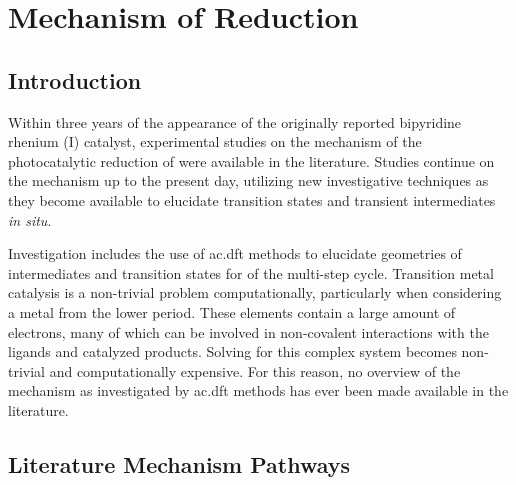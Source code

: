 \chapter{Mechanism of \texorpdfstring{}{CO2} Reduction}\label{chap.mech}

\section{Introduction}

Within three years of the appearance of the originally reported bipyridine rhenium (I) catalyst, experimental studies on the mechanism of the photocatalytic reduction of  were available in the literature\autocite{hawecker1986}. Studies continue on the mechanism up to the present day\autocite{johnson1996, koike2002, takeda2008, smieja2012, machan2014, kou2014}, utilizing new investigative techniques as they become available to elucidate transition states and transient intermediates \textit{in situ}. 

Investigation includes the use of \gls{ac.dft} methods to elucidate geometries of intermediates and transition states for of the multi-step cycle. Transition metal catalysis is a non-trivial problem computationally, particularly when considering a metal from the lower period. These elements contain a large amount of electrons, many of which can be involved in non-covalent interactions with the ligands and catalyzed products. Solving for this complex system becomes non-trivial and computationally expensive. For this reason, no overview of the mechanism as investigated by \gls{ac.dft} methods has ever been made available in the literature. 

\section{Literature Mechanism Pathways}

